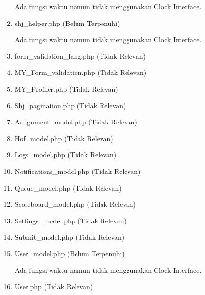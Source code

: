 \begin{enumerate}
	Ada fungsi waktu namun tidak menggunakan Clock Interface.
	
	\item shj\_helper.php (Belum Terpenuhi)
	
	Ada fungsi waktu namun tidak menggunakan Clock Interface.
	
	\item form\_validation\_lang.php (Tidak Relevan)
	\item MY\_Form\_validation.php (Tidak Relevan)
	\item MY\_Profiler.php (Tidak Relevan)
	\item Shj\_pagination.php (Tidak Relevan)
	\item Assignment\_model.php (Tidak Relevan)
	\item Hof\_model.php (Tidak Relevan)
	\item Logs\_model.php (Tidak Relevan)
	\item Notifications\_model.php (Tidak Relevan)
	\item Queue\_model.php (Tidak Relevan)
	\item Scoreboard\_model.php (Tidak Relevan)
	\item Settings\_model.php (Tidak Relevan)
	\item Submit\_model.php (Tidak Relevan)
	\item User\_model.php (Belum Terpenuhi)
	
	Ada fungsi waktu namun tidak menggunakan Clock Interface.
	
	\item User.php (Tidak Relevan)
\end{enumerate}

